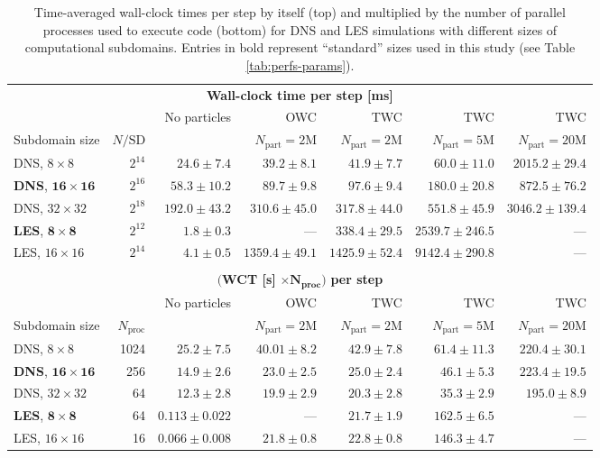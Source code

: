 \documentclass{pracamgren}
\begin{document}
\begin{table}[h]
\centering
\scriptsize
\begin{tabular}{lrrrrrr}
\multicolumn{7}{c}{\textbf{Wall-clock time per step [ms]}} \\
 & & No particles & OWC & TWC & TWC & TWC \\ 
Subdomain size & $N / \text{SD}$ &  & $N_{\text{part}} = 2 \text{M}$ & $N_{\text{part}} = 2 \text{M}$ & $N_{\text{part}} = 5 \text{M}$ & $N_{\text{part}} = 20 \text{M}$ \\ \hline

DNS, $8 \times 8$ & $2^{14}$ & $24.6 \pm 7.4$ & $39.2 \pm 8.1$ & $41.9 \pm 7.7$ & $60.0 \pm 11.0$ & $2015.2 \pm 29.4$ \\
\textbf{DNS}, $\mathbf{16 \times 16}$ & $2^{16}$ & $58.3 \pm 10.2$ & $89.7 \pm 9.8$ & $97.6 \pm 9.4$ & $180.0 \pm 20.8$ & $872.5 \pm 76.2$ \\
DNS, $32 \times 32$ & $2^{18}$ & $192.0 \pm 43.2$ & $310.6 \pm 45.0$ & $317.8 \pm 44.0$ & $551.8 \pm 45.9$ & $3046.2 \pm 139.4$ \\ \hline
\textbf{LES}, $\mathbf{8 \times 8}$ & $2^{12}$ & $1.8 \pm 0.3$ & --- & $338.4 \pm 29.5$ & $2539.7 \pm 246.5$ & --- \\
LES, $16 \times 16$ & $2^{14}$ & $4.1 \pm 0.5$ & $1359.4 \pm 49.1$ & $1425.9 \pm 52.4$ & $9142.4 \pm 290.8$ & --- \\ \hline \hline
 & & & & & & \\
\multicolumn{7}{c}{$\mathbf{(}$\textbf{WCT [s]} $\mathbf{\times N_{\text{proc}})}$ \textbf{per step}} \\
 & & No particles & OWC & TWC & TWC & TWC \\ 
Subdomain size & $N_{\text{proc}}$ &  & $N_{\text{part}} = 2 \text{M}$ & $N_{\text{part}} = 2 \text{M}$ & $N_{\text{part}} = 5 \text{M}$ & $N_{\text{part}} = 20 \text{M}$ \\ \hline

DNS, $8 \times 8$ & 1024 & $25.2 \pm 7.5$ & $40.01 \pm 8.2$ & $42.9 \pm 7.8$ & $61.4 \pm 11.3$ & $220.4 \pm 30.1$ \\
\textbf{DNS}, $\mathbf{16 \times 16}$ & 256 & $14.9 \pm 2.6$ & $23.0 \pm 2.5$ & $25.0 \pm 2.4$ & $46.1 \pm 5.3$ & $223.4 \pm 19.5$ \\
DNS, $32 \times 32$ & 64 & $12.3 \pm 2.8$ & $19.9 \pm 2.9$ & $20.3 \pm 2.8$ & $35.3 \pm 2.9$ & $195.0 \pm 8.9$ \\ \hline
\textbf{LES}, $\mathbf{8 \times 8}$ & 64 & $0.113 \pm 0.022$ & --- & $21.7 \pm 1.9$ & $162.5 \pm 6.5$ & --- \\
LES, $16 \times 16$ & 16 & $0.066 \pm 0.008$ & $21.8 \pm 0.8$ & $22.8 \pm 0.8$ & $146.3 \pm 4.7$ & --- \\ \hline \hline
\end{tabular}
\caption{Time-averaged wall-clock times per step by itself (top) and multiplied by the number of parallel processes used to execute code (bottom) for DNS and LES simulations with different sizes of computational subdomains.
Entries in bold represent ``standard'' sizes used in this study (see Table \ref{tab:perfs-params}).
}
\label{tab:perfs-pfg}
\end{table}
\end{document}
